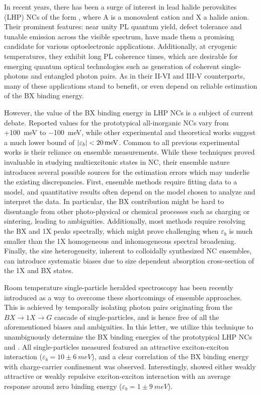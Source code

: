 \documentclass[journal=nalefd, manuscript=letter, layout=twocolumn]{achemso}
\begin{document}
In recent years, there has been a surge of interest in lead halide perovskites (LHP) NCs of the form , where A is a monovalent cation and X a halide anion. Their prominent features: near unity PL quantum yield, defect tolerance and tunable emission across the visible spectrum, have made them a promising candidate for various optoelectronic applications\cite{Protesescu2015,Kovalenko2017}. Additionally, at cryogenic temperatures, they exhibit long PL coherence times, which are desirable for emerging quantum optical technologies such as generation of coherent single-photons\cite{Utzat2019} and entangled photon pairs\cite{Akopian2006}. As in their II-VI and III-V counterparts, many of these applications stand to benefit, or even depend on reliable estimation of the BX binding energy.

However, the value of the BX binding energy in LHP NCs is a subject of current debate. Reported values for the prototypical all-inorganic  NCs vary from +\SI{100}{meV}\cite{Castaneda2016} to \SI{-100}{meV}\cite{Dana2021}, while other experimental and theoretical works suggest a much lower bound of $\abs{\varepsilon_b}<\SI{20}{meV}$\cite{Shulenberger2019,Nguyen2020}. Common to all previous experimental works is their reliance on ensemble measurements. While these techniques proved invaluable in studying multiexcitonic states in NC, their ensemble nature introduces several possible sources for the estimation errors which may underlie the existing discrepancies. First, ensemble methods require fitting data to a model, and quantitative results often depend on the model chosen to analyze and interpret the data\cite{Makarov2016,Ashner2019}. In particular, the BX contribution might be hard to disentangle from other photo-physical or chemical processes such as charging or sintering\cite{Shulenberger2019,Lubin2021}, leading to ambiguities. Additionally, most methods require resolving the BX and 1X peaks spectrally, which might prove challenging when $\varepsilon_b$ is much smaller than the 1X homogeneous and inhomogeneous spectral broadening\cite{Shulenberger2019,Lubin2021}. Finally, the size heterogeneity, inherent to colloidally synthesized NC ensembles, can introduce systematic biases due to size dependent absorption cross-section of the 1X and BX states.

Room temperature single-particle heralded spectroscopy has been recently introduced as a way to overcome these shortcomings of ensemble approaches.\cite{Lubin2021,Vonk2021} This is achieved by temporally isolating photon pairs originating from the $BX{\rightarrow}1X{\rightarrow}G$ cascade of single-particles, and is hence free of all the aforementioned biases and ambiguities. In this letter, we utilize this technique to unambiguously determine the BX binding energies of the prototypical LHP NCs   and . All  single-particles measured featured an attractive exciton-exciton interaction ($\varepsilon_b=10\pm\SI{6}{meV}$), and a clear correlation of the BX binding energy with charge-carrier confinement was observed. Interestingly,  showed either weakly attractive or weakly repulsive exciton-exciton interaction with an average response around zero binding energy ($\varepsilon_b=1\pm\SI{9}{meV}$).
\end{document}
